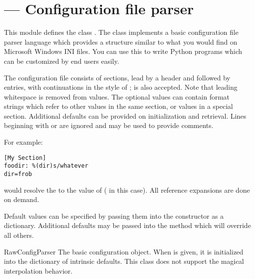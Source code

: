 \section{ ---
         Configuration file parser}


This module defines the class .
The  class implements a basic configuration file
parser language which provides a structure similar to what you would
find on Microsoft Windows INI files.  You can use this to write Python
programs which can be customized by end users easily.

The configuration file consists of sections, lead by a
\samp{[section]} header and followed by  entries,
with continuations in the style of ;  is
also accepted.  Note that leading whitespace is removed from values.
The optional values can contain format strings which refer to other
values in the same section, or values in a special
 section.  Additional defaults can be provided on
initialization and retrieval.  Lines beginning with \character{\#} or
\character{;} are ignored and may be used to provide comments.

For example:

\begin{verbatim}
[My Section]
foodir: %(dir)s/whatever
dir=frob
\end{verbatim}

would resolve the  to the value of
 ( in this case).  All reference expansions are
done on demand.

Default values can be specified by passing them into the
 constructor as a dictionary.  Additional defaults 
may be passed into the  method which will override all
others.

\begin{classdesc}{RawConfigParser}{}
The basic configuration object.  When  is given, it is
initialized into the dictionary of intrinsic defaults.  This class
does not support the magical interpolation behavior.
\end{classdesc}

